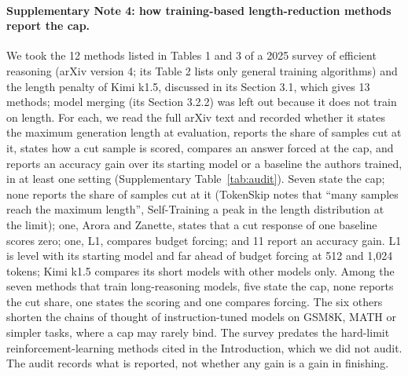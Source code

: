 \documentclass[10pt]{article}
\begin{document}
\paragraph{Supplementary Note 4: how training-based length-reduction methods report the cap.} We took the 12 methods listed in Tables 1 and 3 of a 2025 survey of efficient reasoning\cite{sui2025stopoverthinking} (arXiv version 4; its Table 2 lists only general training algorithms) and the length penalty of Kimi k1.5, discussed in its Section 3.1, which gives 13 methods; model merging (its Section 3.2.2) was left out because it does not train on length. For each, we read the full arXiv text and recorded whether it states the maximum generation length at evaluation, reports the share of samples cut at it, states how a cut sample is scored, compares an answer forced at the cap, and reports an accuracy gain over its starting model or a baseline the authors trained, in at least one setting (Supplementary Table~\ref{tab:audit}). Seven state the cap; none reports the share of samples cut at it (TokenSkip notes that ``many samples reach the maximum length'', Self-Training a peak in the length distribution at the limit); one, Arora and Zanette, states that a cut response of one baseline scores zero; one, L1, compares budget forcing\cite{muennighoff2025s1}; and 11 report an accuracy gain. L1 is level with its starting model and far ahead of budget forcing at 512 and 1{,}024 tokens; Kimi k1.5 compares its short models with other models only. Among the seven methods that train long-reasoning models, five state the cap, none reports the cut share, one states the scoring and one compares forcing. The six others shorten the chains of thought of instruction-tuned models on GSM8K, MATH or simpler tasks, where a cap may rarely bind. The survey predates the hard-limit reinforcement-learning methods cited in the Introduction\cite{yi2025shorterbetter,hou2025thinkprune,shrivastava2026gfpo,liu2025dler}, which we did not audit. The audit records what is reported, not whether any gain is a gain in finishing.
\end{document}
